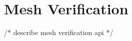\appendix   %

\section{Mesh Verification}\label{sec:mverify}


/* describe mesh verification api */

